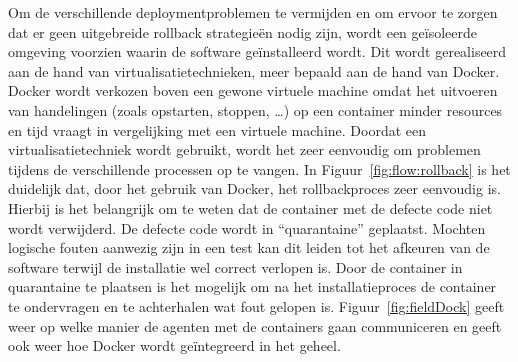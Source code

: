 Om de verschillende deploymentproblemen te vermijden en om ervoor te zorgen dat er geen uitgebreide rollback strategieën nodig zijn, wordt een geïsoleerde omgeving voorzien waarin de software geïnstalleerd wordt. 
Dit wordt gerealiseerd aan de hand van virtualisatietechnieken, meer bepaald aan de hand van Docker.
Docker wordt verkozen boven een gewone virtuele machine omdat het uitvoeren van handelingen (zoals opstarten, stoppen, \ldots) op een container minder resources en tijd vraagt in vergelijking met een virtuele machine.
Doordat een virtualisatietechniek wordt gebruikt, wordt het zeer eenvoudig om problemen tijdens de verschillende processen op te vangen.
In Figuur~\ref{fig:flow:rollback} is het duidelijk dat, door het gebruik van Docker, het rollbackproces zeer eenvoudig is.
Hierbij is het belangrijk om te weten dat de container met de defecte code niet wordt verwijderd.
De defecte code wordt in ``quarantaine'' geplaatst.
Mochten logische fouten aanwezig zijn in een test kan dit leiden tot het afkeuren van de software terwijl de installatie wel correct verlopen is.
Door de container in quarantaine te plaatsen is het mogelijk om na het installatieproces de container te ondervragen en te achterhalen wat fout gelopen is.
Figuur~\ref{fig:fieldDock} geeft weer op welke manier de agenten met de containers gaan communiceren en geeft ook weer hoe Docker wordt geïntegreerd in het geheel.

